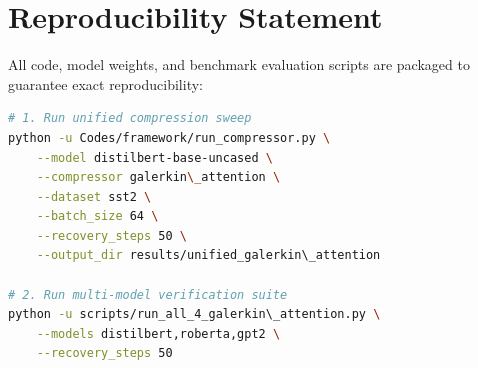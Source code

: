 \section{Reproducibility Statement}
All code, model weights, and benchmark evaluation scripts are packaged to guarantee exact reproducibility:
\begin{lstlisting}[language=bash]
# 1. Run unified compression sweep
python -u Codes/framework/run_compressor.py \
    --model distilbert-base-uncased \
    --compressor galerkin\_attention \
    --dataset sst2 \
    --batch_size 64 \
    --recovery_steps 50 \
    --output_dir results/unified_galerkin\_attention

# 2. Run multi-model verification suite
python -u scripts/run_all_4_galerkin\_attention.py \
    --models distilbert,roberta,gpt2 \
    --recovery_steps 50
\end{lstlisting}
